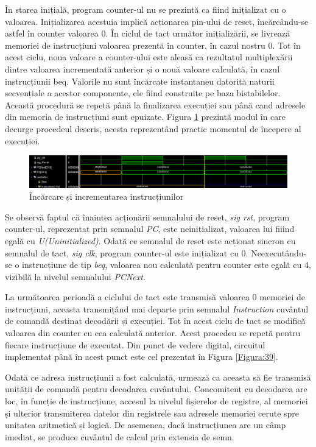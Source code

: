 \documentclass[12pt]{article}
\begin{document}
 În starea inițială, program counter-ul nu se prezintă ca fiind inițializat cu o valoarea. Inițializarea acestuia implică acționarea pin-ului de reset, încărcându-se astfel în counter valoarea 0. În ciclul de tact următor inițializării, se livrează memoriei de instrucțiuni valoarea prezentă în counter, în cazul nostru 0. Tot în acest ciclu, noua valoare a counter-ului este aleasă ca rezultatul multiplexării dintre valoarea incrementată anterior și o nouă valoare calculată, în cazul instrucțiunii beq. Valorile nu sunt încărcate instantaneu datorită naturii secvențiale a acestor componente, ele fiind construite pe baza bistabilelor. Această procedură se repetă până la finalizarea execuției sau până cand adresele din memoria de instrucțiuni sunt epuizate. Figura \ref{Figura:50} prezintă modul în care decurge procedeul descris, acesta reprezentând practic momentul de începere al execuției.

 \begin{figure}[h!]
 \includegraphics[width=1.025\textwidth]{tbfetch.png}
 \centering
 \caption{Încărcare și incrementarea instrucțiunilor}
 \label{Figura:50}
 \end{figure}
 
 Se observă faptul că înaintea acționării semnalului de reset, \textit{sig rst}, program counter-ul, reprezentat prin semnalul \textit{PC}, este neinițializat, valoarea lui fiiind egală cu \textit{U(Uninitialized)}. Odată ce semnalul de reset este acționat sincron cu semnalul de tact, \textit{sig clk}, program counter-ul este inițializat cu 0. Neexecutându-se o instrucțiune de tip \textit{beq}, valoarea nou calculată pentru counter este egală cu 4, vizibilă la nivelul semnalului \textit{PCNext}.
 
 La următoarea perioadă a ciclului de tact este transmisă valoarea 0 memoriei de instrucțiuni, aceasta transmițând mai departe prin semnalul \textit{Instruction} cuvântul de comandă destinat decodării și execuției. Tot în acest ciclu de tact se modifică valoarea din counter cu cea calculată anterior. Acest procedeu se repetă pentru fiecare instrucțiune de executat. Din punct de vedere digital, circuitul implementat până în acest punct este cel prezentat în Figura \ref{Figura:39}. 

Odată ce adresa instrucțiunii a fost calculată, urmează ca aceasta să fie transmisă unității de comandă pentru decodarea cuvântului. Concomitent cu decodarea are loc, în funcție de instrucțiune, accesul la nivelul fișierelor de registre, al memoriei și ulterior transmiterea datelor din registrele sau adresele memoriei cerute spre unitatea aritmetică și logică. De asemenea, dacă instrucțiunea are un câmp imediat, se produce cuvântul de calcul prin extensia de semn.
 
\end{document}
